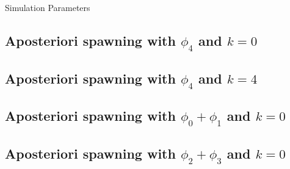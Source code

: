 \begin{chapter}{Simulation Parameters}
\subsection{Aposteriori spawning with $\phi_4$ and $k=0$}
\label{cfg:delta_gap_apost_phi4_k0}
\subsection{Aposteriori spawning with $\phi_4$ and $k=4$}
\label{cfg:delta_gap_apost_phi4_k4}

\subsection{Aposteriori spawning with $\phi_0 + \phi_1$ and $k=0$}
\label{cfg:delta_gap_apost_phi0phi1_k0}
\subsection{Aposteriori spawning with $\phi_2 + \phi_3$ and $k=0$}
\label{cfg:delta_gap_apost_phi2phi3_k0}

\end{chapter}
